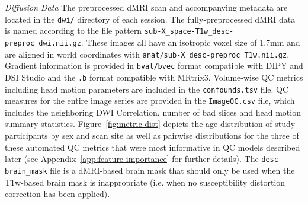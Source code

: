 \documentclass[9pt,lineno]{elife}
\begin{document}
\emph{Diffusion Data} The preprocessed dMRI scan and accompanying metadata are located in the 
\texttt{dwi/} directory of each session. The fully-preprocessed dMRI data is named according to
the file pattern \texttt{sub-X\_space-T1w\_desc-preproc\_dwi.nii.gz}. These images all have an isotropic voxel
size of 1.7mm and are aligned in world coordinates with \texttt{anat/sub-X\_desc-preproc\_T1w.nii.gz}.
Gradient information is provided in \texttt{bval/bvec} format compatible with DIPY and DSI Studio and
the \texttt{.b} format compatible with MRtrix3. Volume-wise QC metrics including head motion parameters
are included in the \texttt{confounds.tsv} file. QC measures for the entire image series are provided
in the \texttt{ImageQC.csv} file, which includes the neighboring DWI Correlation, number of bad slices
and head motion summary statistics.
Figure~\ref{fig:metric-dist} depicts the age distribution of study participants by sex and scan site as well as pairwise distributions for the three of these automated QC metrics that were most informative in QC models described later (see Appendix~\ref{app:feature-importance} for further details).
The \texttt{desc-brain\_mask} file is a dMRI-based brain mask that
should only be used when the T1w-based brain mask is inappropriate (i.e. when no susceptibility distortion
correction has been applied).
\end{document}
